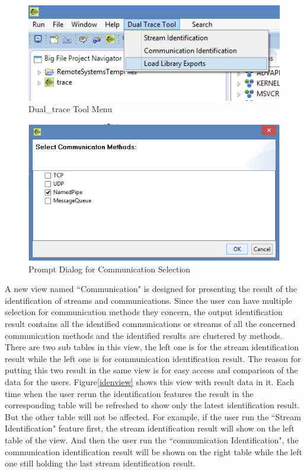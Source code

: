 \begin{figure}[H]
\centerline{\includegraphics{Figures/dualtracetoolmenu}}
 \caption{Dual\_trace Tool Menu}
\label{dualtracetoolmenu}
\end{figure}

\begin{figure}[H]
\centerline{\includegraphics[scale=0.8]{Figures/methods}}
 \caption{Prompt Dialog for Communication Selection}
\label{methods}
\end{figure}

A new view named ``Communication" is designed for presenting the result of the identification of streams and communications. Since the user can have multiple selection for communication methods they concern, the output identification result contains all the identified communications or streams of all the concerned communication methods and the identified results are clustered by methods. There are two sub tables in this view, the left one is for the stream identification result while the left one is for communication identification result. The reason for putting this two result in the same view is for easy access and comparison of the data for the users. Figure\ref{idenview} shows this view with result data in it. Each time when the user rerun the identification features the result in the corresponding table will be refreshed to show only the latest identification result. But the other table will not be affected. For example, if the user run the ``Stream Identification" feature first, the stream identification result will show on the left table of the view. And then the user run the ``communication Identification", the communication identification result will be shown on the right table while the left one still holding the last stream identification result.

